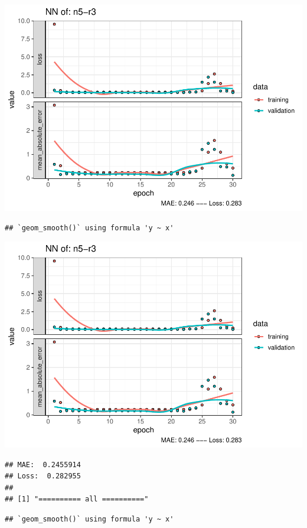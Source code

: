 \documentclass[
]{article}
\begin{document}
\includegraphics{project-code_files/figure-latex/unnamed-chunk-18-39.pdf}

\begin{verbatim}
## `geom_smooth()` using formula 'y ~ x'
\end{verbatim}

\includegraphics{project-code_files/figure-latex/unnamed-chunk-18-40.pdf}

\begin{verbatim}
## MAE:  0.2455914
## Loss:  0.282955 
## 
## [1] "========== all =========="
\end{verbatim}

\begin{verbatim}
## `geom_smooth()` using formula 'y ~ x'
\end{verbatim}
\end{document}
